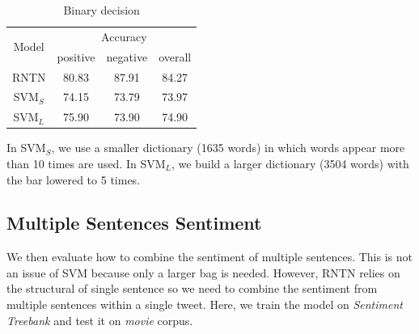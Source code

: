\begin{table}[H]
  \begin{center}
    \begin{tabular}{cccc}\hline
      \multirow{2}{*}{Model} 
      & \multicolumn{3}{c}{Accuracy} \\\cline{2-4}
    & positive & negative & overall \\ \hline
    RNTN  & 80.83      &   87.91   &  84.27      \\ 
    SVM$_S$  & 74.15      &  73.79    &    73.97     \\ 
    SVM$_L$  & 75.90      & 73.90         &   74.90      \\ \hline
    \end{tabular}
    \end{center}
    \caption{\label{exp_1} Binary decision}
\end{table}

In SVM$_S$, we use a smaller dictionary (1635 words) in which words appear more than 10 times are used. In SVM$_L$, we build a larger dictionary (3504 words) with the bar lowered to 5 times. 


\subsection{Multiple Sentences Sentiment}
We then evaluate how to combine the sentiment of multiple sentences. This is not an issue of SVM because only a larger bag is needed. However, RNTN relies on the structural of single sentence so we need to combine the sentiment from multiple sentences within a single tweet. Here, we train the model on \textit{Sentiment Treebank} and test it on \textit{movie} corpus. 

